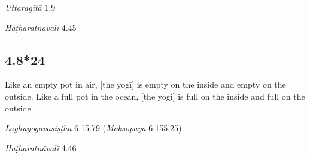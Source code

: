 \begin{ekdosis}
\begin{sources}[hp04_008_23]
\emph{Uttaragītā} 1.9
\begin{versinnote}
\end{versinnote}
\end{sources}

\begin{testimonia}[hp04_008_23]
\emph{Haṭharatnāvalī} 4.45
\begin{versinnote}
\end{versinnote}
\end{testimonia}


\subsection*{4.8*24}
\begin{translation}[hp04_008_24]
Like an empty pot in air, [the yogī] is empty on the inside and empty on the outside. Like a full pot in the ocean, [the yogi] is full on the inside and full on the outside.%
\end{translation}

\begin{sources}[hp04_008_24]
\emph{Laghuyogavāsiṣṭha} 6.15.79 (\emph{Mokṣopāya} 6.155.25)
\begin{versinnote}
\end{versinnote}
\end{sources}

\begin{testimonia}[hp04_008_24]
\emph{Haṭharatnāvalī} 4.46
\begin{versinnote}
\end{versinnote}


\end{testimonia}
\end{ekdosis}
